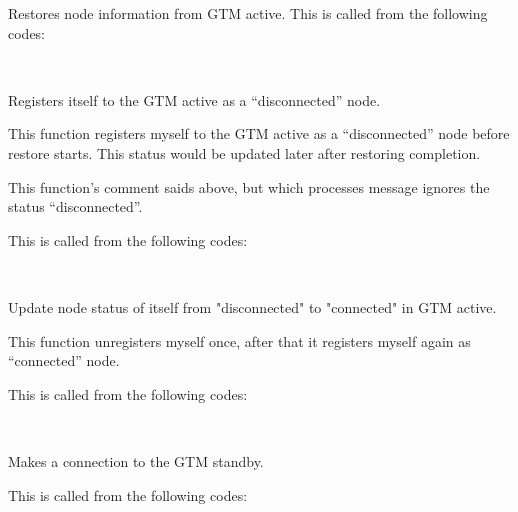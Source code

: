   
    Restores node information from GTM active.
    This is called from the following codes:
    
    \FuncRefHdr
		\\ \hline
    \FuncRefTrailor
  
  
    Registers itself to the GTM active as a ``disconnected'' node.
    
    This function registers myself to the GTM active as a ``disconnected'' node before restore starts.
    This status would be updated later after restoring completion.
    
    This function's comment saids above, but  which processes  message ignores the status ``disconnected''.
    
    This is called from the following codes:
    
    \FuncRefHdr
		\\ \hline
    \FuncRefTrailor
  
  
    Update node status of itself from "disconnected" to "connected" in GTM active.
    
    This function unregisters myself once, after that it registers myself again as ``connected'' node.
    
    This is called from the following codes:
    
    \FuncRefHdr
		\\ \hline
    \FuncRefTrailor
  
  
    Makes a connection to the GTM standby.
    
    This is called from the following codes:
    
    \FuncRefHdr
		\\
		\\ \hline
    \FuncRefTrailor
  
